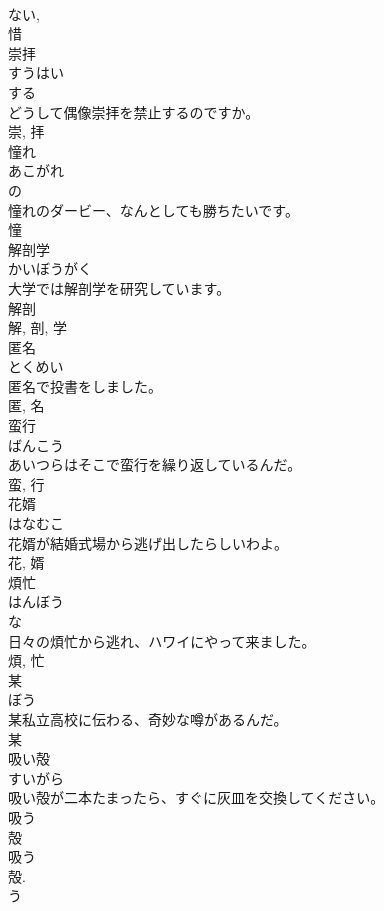 \documentclass[8pt]{extreport}
\begin{document}
\begin{CJK}{UTF8}{min}
\\	ない, 
\\	惜	
\\	崇拝	
\\	すうはい	
\\	する 
\\	どうして偶像崇拝を禁止するのですか。	
\\	崇, 拝	
\\	憧れ	
\\	あこがれ	
\\	の 
\\	憧れのダービー、なんとしても勝ちたいです。	
\\	憧	
\\	解剖学	
\\	かいぼうがく	
\\	大学では解剖学を研究しています。	
\\	解剖 
\\	解, 剖, 学	
\\	匿名	
\\	とくめい	
\\	匿名で投書をしました。	
\\	匿, 名	
\\	蛮行	
\\	ばんこう	
\\	あいつらはそこで蛮行を繰り返しているんだ。	
\\	蛮, 行	
\\	花婿	
\\	はなむこ	
\\	花婿が結婚式場から逃げ出したらしいわよ。	
\\	花, 婿	
\\	煩忙	
\\	はんぼう	
\\	な 
\\	日々の煩忙から逃れ、ハワイにやって来ました。	
\\	煩, 忙	
\\	某	
\\	ぼう	
\\	某私立高校に伝わる、奇妙な噂があるんだ。	
\\	某	
\\	吸い殻	
\\	すいがら	
\\	吸い殻が二本たまったら、すぐに灰皿を交換してください。	
\\	吸う 
\\	殻 
\\	吸う 
\\	殻. 
\\	う 

\end{CJK}
\end{document}

